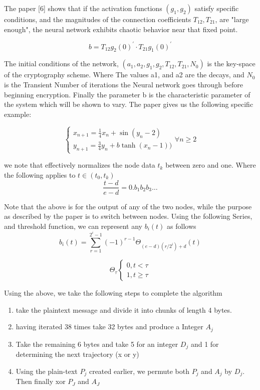 \documentclass[12pt, letterpaper]{article}
\begin{document}
The paper [6] shows that if the activation functions \((g_{1}, g_{2})\) satisfy specific conditions, and the magnitudes of the connection coefficients \(T_{12}, T_{21}\), are "large enough", the neural network exhibits chaotic behavior near that fixed point.

\begin{equation}\label{b defintion}
b = T_{12}g_{2}(0)^{'} \cdot T_{21}g_{1}(0)^{'}
\end{equation}

The initial conditions of the network, \((a_1, a_2, g_1, g_2, T_{12}, T_{21}, N_{0})\) is the key-space of the cryptography scheme. Where The values a1, and a2 are the decays, and \(N_{0}\) is the Transient Number of iterations the Neural network goes through before beginning encryption. Finally the parameter b is the characteristic parameter of the system which will be shown to vary. The paper gives us the following specific example:

\begin{equation}\label{hopfield network}
    \begin{cases}
    x_{n+1} = \frac{1}{4}x_{n} + \sin(y_{n} - 2)\\
    y_{n+1} = \frac{3}{4}y_{n} + b\tanh(x_{n} - 1))
    \end{cases} \forall n \geq 2
\end{equation}

we note that effectively normalizes the node data \(t_{k}\) between zero and one. Where the following applies to \(t \in (t_{0}, t_{k})\)
\[\frac{t - d}{e -d} = 0.b_{1}b_{2}b_{3}\dots\]

Note that the above is for the output of any of the two nodes, while the purpose as described by the paper is to switch between nodes.  
Using the following Series, and threshold function, we can represent any \(b_{i}(t)\) as follows
\[b_{i}(t) = \sum_{r=1}^{2^{i} - 1}(-1)^{r-1}\Theta_{(e - d)(r/2^{i}) + d}(t)\]

\[\Theta_\tau
\begin{cases}
0, t < \tau \\
1, t \geq \tau
\end{cases}
\]

Using the above, we take the following steps to complete the algorithm
\begin{enumerate}
    \item take the plaintext message and divide it into chunks of length 4 bytes. 
    \item having iterated 38 times take 32 bytes and produce a Integer \(A_{j}\)
    \item Take the remaining 6 bytes and take 5 for an integer \(D_j\) and 1 for determining the next trajectory (x or y)
    \item Using the plain-text \(P_j\) created earlier, we permute both \(P_j\) and \(A_j\) by \(D_j\). Then finally xor \(P_J\) and \(A_J\)
\end{enumerate}
\end{document}
